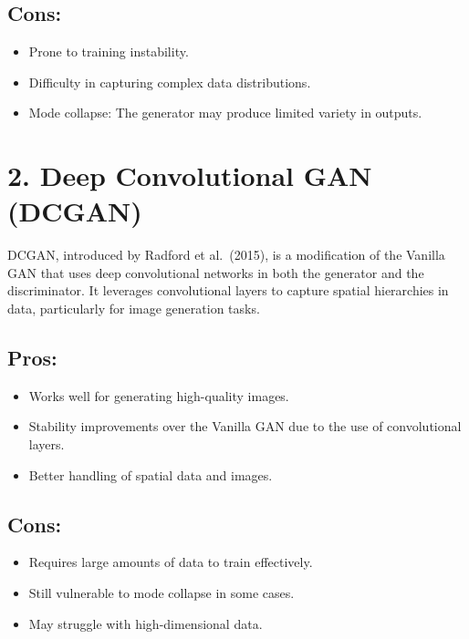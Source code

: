 \documentclass[
]{book}
\providecommand{\tightlist}{%
  \setlength{\itemsep}{0pt}\setlength{\parskip}{0pt}}
\begin{document}
\subsection{Cons:}\label{cons}

\begin{itemize}
\tightlist
\item
  Prone to training instability.
\item
  Difficulty in capturing complex data distributions.
\item
  Mode collapse: The generator may produce limited variety in outputs.
\end{itemize}

\section{2. Deep Convolutional GAN (DCGAN)}\label{deep-convolutional-gan-dcgan}

DCGAN, introduced by Radford et al.~(2015), is a modification of the Vanilla GAN that uses deep convolutional networks in both the generator and the discriminator. It leverages convolutional layers to capture spatial hierarchies in data, particularly for image generation tasks.

\subsection{Pros:}\label{pros-1}

\begin{itemize}
\tightlist
\item
  Works well for generating high-quality images.
\item
  Stability improvements over the Vanilla GAN due to the use of convolutional layers.
\item
  Better handling of spatial data and images.
\end{itemize}

\subsection{Cons:}\label{cons-1}

\begin{itemize}
\tightlist
\item
  Requires large amounts of data to train effectively.
\item
  Still vulnerable to mode collapse in some cases.
\item
  May struggle with high-dimensional data.
\end{itemize}
\end{document}
